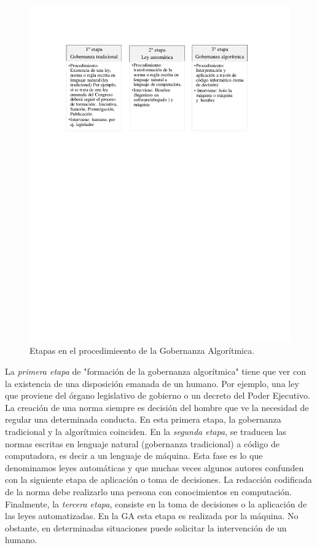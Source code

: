 \documentclass[12pt]{report} %
\begin{document}
\begin{figure}
\centering
\includegraphics[width=0.85\columnwidth]{imagenes/tabladega.pdf}
\caption{Etapas en el procedimieento de la Gobernanza Algorítmica.}
\label{tabladega.pdf}
\end{figure} 

La \textit{primera etapa} de "formación de la gobernanza algorítmica" tiene que ver con la existencia de una disposición emanada de un humano. Por ejemplo, una ley que proviene del órgano legislativo de gobierno o un decreto del Poder Ejecutivo. La creación de una norma siempre es decisión del hombre que ve la necesidad de regular una determinada conducta. En esta primera etapa, la gobernanza tradicional y la algorítmica coinciden. En la \textit{segunda etapa}, se traducen las normas escritas en lenguaje natural (gobernanza tradicional) a código de computadora, es decir a un lenguaje de máquina. Esta fase es lo que denominamos leyes automáticas y que muchas veces algunos autores confunden con la siguiente etapa de aplicación o toma de decisiones. La redacción codificada de la norma debe realizarlo una persona con conocimientos en computación. Finalmente, la \textit{tercera etapa}, consiste en la toma de decisiones o la aplicación de las leyes automatizadas. En la GA esta etapa es realizada por la máquina. No obstante, en determinadas situaciones puede solicitar la intervención de un humano.
\end{document}

